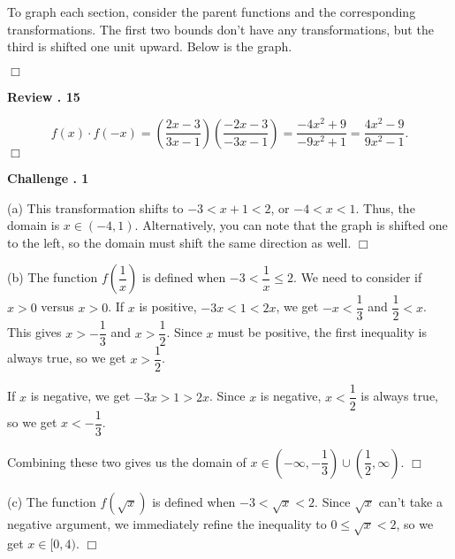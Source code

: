 \documentclass[lang=en,11pt]{elegantbook}
\begin{document}
To graph each section, consider the parent functions and the corresponding transformations.  The first two bounds don't have any transformations, but the third is shifted one unit upward.  Below is the graph.
\begin{figure}[!h]
    \centering
\end{figure} $\Box$

\noindent \textbf{Review . 15}

$$f(x) \cdot f(-x) =\left(\dfrac{2x-3}{3x-1}\right)\left(\dfrac{-2x-3}{-3x-1}\right)=\dfrac{-4x^2+9}{-9x^2+1}=\boxed{\dfrac{4x^2-9}{9x^2-1}}.$$ $\Box$

\noindent \textbf{Challenge . 1}

(a) This transformation shifts to $-3 < x+1 < 2$, or $-4 < x < 1$.  Thus, the domain is $\boxed{x\in(-4,1)}$. Alternatively, you can note that the graph is shifted one to the left, so the domain must shift the same direction as well. $\Box$

(b) The function $f\left(\dfrac{1}{x}\right)$ is defined when $-3<\dfrac{1}{x}\leq 2$.  We need to consider if $x>0$ versus $x>0$.  If $x$ is positive, $-3x < 1 < 2x$, we get $-x < \dfrac{1}{3}$ and $\dfrac{1}{2} < x$.  This gives $x > -\dfrac{1}{3}$ and $x > \dfrac{1}{2}$.  Since $x$ must be positive, the first inequality is always true, so we get $x>\dfrac{1}{2}$.

If $x$ is negative, we get $-3x > 1 > 2x$.  Since $x$ is negative, $x<\dfrac{1}{2}$ is always true, so we get $x<-\dfrac{1}{3}$.

Combining these two gives us the domain of $\boxed{x\in\left(-\infty,-\dfrac{1}{3}\right)\cup\left(\dfrac{1}{2},\infty\right)}$. $\Box$

(c) The function $f\left(\sqrt{x}\right)$ is defined when $-3<\sqrt{x}<2$.  Since $\sqrt{x}$ can't take a negative argument, we immediately refine the inequality to $0\leq\sqrt{x}<2$, so we get $\boxed{x\in[0,4)}$. $\Box$
\end{document}
